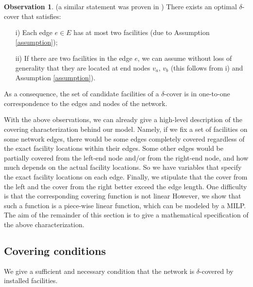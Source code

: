 \documentclass[review]{elsarticle}
\newcommand{\dlt}{{\delta}}
\DeclareMathOperator*{\inter}{int}
\theoremstyle{definition}
\newtheorem{observation}{Observation}[section]
\begin{document}
\begin{observation}{(a similar statement was proven in \cite{Hamacher20})}
There exists an optimal $\dlt$-cover that satisfies:
\begin{enumerate}
	\item[i)] Each edge $e \in E$ has at most two facilities (due to Assumption \ref{assumption});
	\item[ii)] If there are two facilities in the edge $e$, we can assume without loss of generality that they are located at end nodes $v_a$, $v_b$ (this follows from i) and  Assumption \ref{assumption}).
\end{enumerate}
As a consequence, the set of candidate facilities of a $\dlt$-cover is in one-to-one correspondence to the edges and nodes of the network.
\end{observation}

With the above observations, we can already give a high-level description of the covering characterization behind our model. %
Namely, if we fix a set of facilities on some network edges, there would be some edges completely covered regardless of the exact facility locations within their edges. Some other edges would be partially covered from the left-end node and/or from the right-end node, and how much
depends on the actual facility locations. So we have variables that
specify the exact facility locations on each edge. Finally, we stipulate that the cover from the left and the cover from the right better exceed the edge length. %
One difficulty is that the corresponding covering function
is not linear %
However, we show that such a function is a piece-wise linear function, which can be modeled by a MILP. The aim of the remainder of this section is to give a mathematical  specification of the above characterization.



\subsection{Covering conditions}
We give a sufficient and necessary condition that the network is $\dlt$-covered by installed facilities.
 
\end{document}
